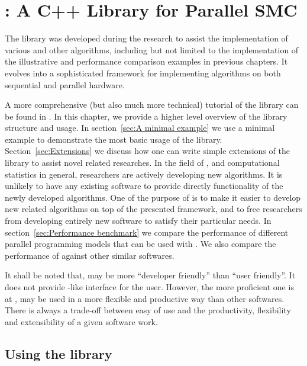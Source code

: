 \chapter{\protect\vsmc: A C++ Library for Parallel SMC}
\label{cha:vSMC: A C++ Library for Parallel SMC}

The \vsmc library \cite{software:VSMC} was developed during the research to
assist the implementation of various \smc and other algorithms, including but
not limited to the implementation of the illustrative and performance
comparison examples in previous chapters. It evolves into a sophisticated \cpp
framework for implementing \smc algorithms on both sequential and parallel
hardware.

A more comprehensive (but also much more technical) tutorial of the library
can be found in \cite{software:VSMC}. In this chapter, we provide a higher
level overview of the library structure and usage. In section~\ref{sec:A
  minimal example} we use a minimal example to demonstrate the most basic
usage of the library. Section~\ref{sec:Extensions} we discuss how one can
write simple extensions of the library to assist novel \smc related
researches. In the field of \smc, and computational statistics in general,
researchers are actively developing new algorithms. It is unlikely to have any
existing software to provide directly functionality of the newly developed
algorithms. One of the purpose of \vsmc is to make it easier to develop new
\smc related algorithms on top of the presented framework, and to free
researchers from developing entirely new software to satisfy their particular
needs. In section~\ref{sec:Performance benchmark} we compare the performance
of different parallel programming models that can be used with \vsmc. We also
compare the performance of \vsmc against other similar softwares.

It shall be noted that, \vsmc may be more ``developer friendly'' than ``user
friendly''. It does not provide \bugs-like interface for the user. However,
the more proficient one is at \cpp, \vsmc may be used in a more flexible and
productive way than other softwares. There is always a trade-off between
easy of use and the productivity, flexibility and extensibility of a given
software work.

\section{Using the \protect\vsmc library}
\label{sec:Using the vSMC library}

